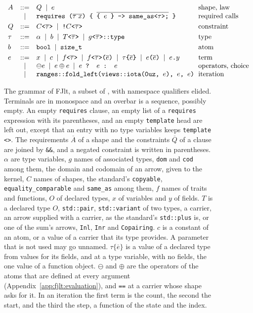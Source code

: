 \begin{figure}[htbp]
\[\begin{array}{lcl@{\hspace{0.6em}}l}
A &::=& Q \;\mid\; e & \text{shape, law} \\
  & \mid & \texttt{requires (}\overline{\tau\; x}\texttt{) \{ } \overline{\texttt{\{ }e\texttt{ \} -> same\_as<}\tau\texttt{>;}} \texttt{ \}} & \text{required calls} \\[3pt]
Q &::=& C\texttt{<}\overline{\tau}\texttt{>} \;\mid\; \texttt{!}C\texttt{<}\overline{\tau}\texttt{>} & \text{constraint} \\[3pt]
\tau &::=& \alpha \;\mid\; b \;\mid\; T\texttt{<}\overline{\tau}\texttt{>} \;\mid\; g\texttt{<}\overline{\tau}\texttt{>::type} & \text{type} \\[3pt]
b &::=& \texttt{bool} \;\mid\; \texttt{size\_t} & \text{atom} \\[3pt]
e &::=& x \;\mid\; c \;\mid\; f\texttt{<}\overline{\tau}\texttt{>} \;\mid\; f\texttt{<}\overline{\tau}\texttt{>(}\overline{e}\texttt{)} \;\mid\; \tau\texttt{\{}\overline{e}\texttt{\}} \;\mid\; e\texttt{(}\overline{e}\texttt{)} \;\mid\; e\texttt{.}y & \text{term} \\
  & \mid & \ominus e \;\mid\; e \oplus e \;\mid\; e \texttt{ ? } e \texttt{ : } e & \text{operators, choice} \\
  & \mid & \texttt{ranges::fold\_left(views::iota(0uz, }e\texttt{), }e\texttt{, }e\texttt{)} & \text{iteration} \\
\end{array}
\]
\caption{The grammar of FJlt, a subset of , with namespace qualifiers elided.
Terminals are in monospace and an overbar is a sequence, possibly empty.
An empty \texttt{requires} clause, an empty list of a \texttt{requires} expression with its parentheses, and an empty \texttt{template} head are left out, except that an entry with no type variables keeps \texttt{template <>}.
The requirements $\overline{A}$ of a shape and the constraints $\overline{Q}$ of a clause are joined by \texttt{\&\&}, and a negated constraint is written in parentheses.
$\alpha$ are type variables, $g$ names of associated types, \texttt{dom} and \texttt{cod} among them, the domain and codomain of an arrow, given to the kernel, $C$ names of shapes, the standard's \texttt{copyable}, \texttt{equality\_comparable} and \texttt{same\_as} among them, $f$ names of traits and functions, $O$ of declared types, $x$ of variables and $y$ of fields.
$T$ is a declared type $O$, \texttt{std::pair}, \texttt{std::variant} of two types, a carrier, an arrow supplied with a carrier, as the standard's \texttt{std::plus} is, or one of the sum's arrows, \texttt{Inl}, \texttt{Inr} and \texttt{Copairing}.
$c$ is a constant of an atom, or a value of a carrier that its type provides.
A parameter that is not used may go unnamed.
$\tau\texttt{\{}\overline{e}\texttt{\}}$ is a value of a declared type from values for its fields, and at a type variable, with no fields, the one value of a function object.
$\ominus$ and $\oplus$ are the operators of the atoms that are defined at every argument (Appendix~\ref{app:fjlt:evaluation}), and \texttt{==} at a carrier whose shape asks for it.
In an iteration the first term is the count, the second the start, and the third the step, a function of the state and the index.}
\label{fig:fjlt-syntax}
\end{figure}
